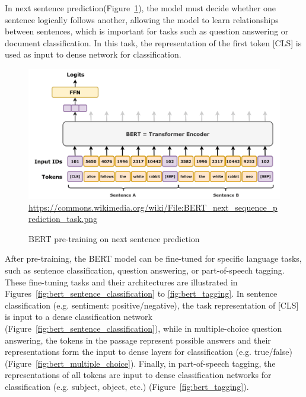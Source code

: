 In next sentence prediction(Figure~\ref{fig:bert_next_sentence_prediction}), the model must decide whether one sentence logically follows another, allowing the model to learn relationships between sentences, which is important for tasks such as question answering or document classification. In this task, the representation of the first token [CLS] is used as input to dense network for classification. 

\begin{figure}
\begin{center}
\includegraphics[width=.8\textwidth]{BERT_next_sequence_prediction_task.png} \\
\tiny \url{https://commons.wikimedia.org/wiki/File:BERT_next_sequence_prediction_task.png} \normalsize

\end{center}
\caption{BERT pre-training on next sentence prediction}
\label{fig:bert_next_sentence_prediction}
\end{figure}

After pre-training, the BERT model can be fine-tuned for specific language tasks, such as sentence classification, question answering, or part-of-speech tagging. These fine-tuning tasks and their architectures are illustrated in Figures~\ref{fig:bert_sentence_classification} to \ref{fig:bert_tagging}. In sentence classification (e.g. sentiment: positive/negative), the task representation of [CLS] is input to a dense classification network (Figure~\ref{fig:bert_sentence_classification}), while in multiple-choice question answering, the tokens in the passage represent possible answers and their representations form the input to dense layers for classification (e.g. true/false) (Figure~\ref{fig:bert_multiple_choice}). Finally, in part-of-speech tagging, the representations of all tokens are input to dense classification networks for classification (e.g. subject, object, etc.) (Figure~\ref{fig:bert_tagging}).  

